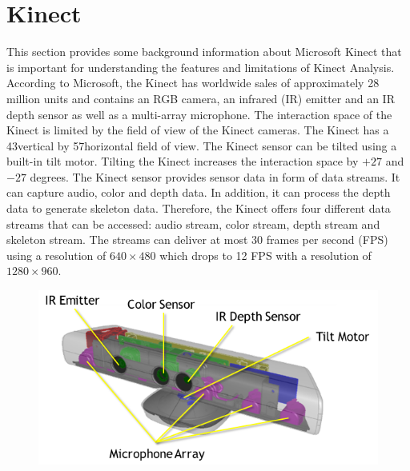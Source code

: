 \section{Kinect}
This section provides some background information about Microsoft Kinect that is important
for understanding the features and limitations of Kinect Analysis.
According to Microsoft, the Kinect  has worldwide sales of approximately 28 million units and contains an RGB camera, an infrared (IR) emitter and an IR depth sensor as well as a multi-array microphone. The interaction space of the Kinect is limited by the field of view of the Kinect cameras. The Kinect has a 43\degree vertical by 57\degree horizontal field of view. The Kinect sensor can be tilted using a built-in tilt motor. Tilting the Kinect increases the interaction space by $+27$ and $-27$ degrees.
The Kinect sensor provides sensor data in form of data streams. It can capture audio, color
and depth data. In addition, it can process the depth data to generate skeleton data. Therefore, the Kinect offers four different data streams that can be accessed: audio stream, color stream, depth stream and skeleton stream.
The streams can deliver at most 30 frames per second (FPS) using a resolution of $640\times480$ which drops to 12 FPS with a resolution of $1280\times960$.

\begin{figure}[h]
    \centering
    \includegraphics[height=0.25\textheight]{fig02/kinect}
    \label{fig:kinect}
\end{figure}

